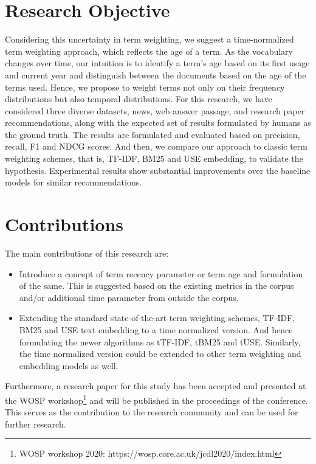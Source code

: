 	\section{Research Objective}
	Considering this uncertainty in term weighting, we suggest a time-normalized term weighting approach, which reflects the age of a term. As the vocabulary changes over time, our intuition is to identify a term’s age based on its first usage and current year and distinguish between the documents based on the age of the terms used. Hence, we propose to weight terms not only on their frequency distributions but also temporal distributions.
	For this research, we have considered three diverse datasets, news, web answer passage, and research paper recommendations, along with the expected set of results formulated by humans as the ground truth. The results are formulated and evaluated based on precision, recall, F1 and NDCG scores. And then, we compare our approach to classic term weighting schemes, that is, TF-IDF, BM25 and USE embedding, to validate the hypothesis.
	Experimental results show substantial improvements over the baseline models for similar recommendations.

\section{Contributions}
The main contributions of this research are:
	\begin{itemize}
	    \item Introduce a concept of term recency parameter or term age and formulation of the same. This is suggested based on the existing metrics in the corpus and/or additional time parameter from outside the corpus.
	    \item Extending the standard state-of-the-art term weighting schemes, TF-IDF, BM25 and USE text embedding to a time normalized version. And hence formulating the newer algorithms as tTF-IDF, tBM25 and tUSE. Similarly, the time normalized version could be extended to other term weighting and embedding models as well.
	\end{itemize}
Furthermore, a research paper for this study has been accepted and presented at the WOSP workshop\footnote{WOSP workshop 2020: https://wosp.core.ac.uk/jcdl2020/index.html} and will be published in the proceedings of the conference. This serves as the contribution to the research community and can be used for further research.